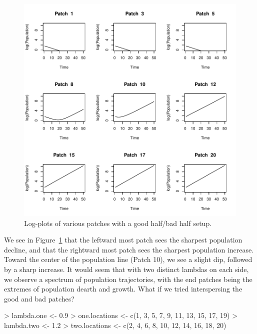 \documentclass[10pt, oneside, reqno]{article}
\theoremstyle{plain}
\begin{document}
\begin{figure}
\begin{center}
\includegraphics{spa1_tn248-popplot}
\end{center}
\caption{Log-plots of various patches with a good half/bad half setup.}
\label{fig:popplot}
\end{figure}

We see in Figure~\ref{fig:popplot} that the leftward most patch sees the sharpest population decline, and that the rightward most patch sees the sharpest population increase. Toward the center of the population line (Patch 10), we see a slight dip, followed by a sharp increase. It would seem that with two distinct lambdas on each side, we observe a spectrum of population trajectories, with the end patches being the extremes of population dearth and growth. What if we tried interspersing the good and bad patches?

\begin{Schunk}
\begin{Sinput}
> lambda.one <- 0.9
> one.locations <- c(1, 3, 5, 7, 9, 11, 13, 15, 17, 19)
> lambda.two <- 1.2
> two.locations <- c(2, 4, 6, 8, 10, 12, 14, 16, 18, 20)
\end{Sinput}
\end{Schunk}
\end{document}
